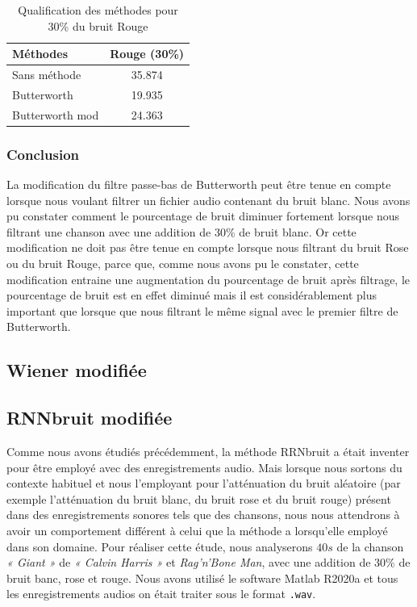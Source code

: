 \documentclass[conference,onecolumn]{IEEEtran}
\begin{document}
\begin{table}[hbt!]
    \centering
    \begin{tabular}{ l  c }
    \textbf{Méthodes} & \textbf{Rouge (30\%)} \\
    \hline
    Sans méthode &  35.874\\
    Butterworth &  19.935\\
    Butterworth mod &  24.363\\
    \end{tabular}
    \caption{Qualification des méthodes pour 30\% du bruit Rouge}
    \label{table:t7}
\end{table}

\subsubsection{Conclusion}
La modification du filtre passe-bas de Butterworth peut être tenue en compte lorsque nous voulant filtrer un fichier audio contenant du bruit blanc. Nous avons pu constater comment le pourcentage de bruit diminuer fortement lorsque nous filtrant une chanson avec une addition de 30\% de bruit blanc. Or cette modification ne doit pas être tenue en compte lorsque nous filtrant du bruit Rose ou du bruit Rouge, parce que, comme nous avons pu le constater, cette modification entraine une augmentation du pourcentage de bruit après filtrage, le pourcentage de bruit est en effet diminué mais il est considérablement plus important que lorsque que nous filtrant le même signal avec le premier filtre de Butterworth.

\subsection{\textbf{Wiener modifiée}}

\subsection{\textbf{RNNbruit modifiée}}
Comme nous avons étudiés précédemment, la méthode RRNbruit a était inventer pour être employé avec des enregistrements audio. Mais lorsque nous sortons du contexte habituel et nous l’employant pour l’atténuation du bruit aléatoire (par exemple l’atténuation du bruit blanc, du bruit rose et du bruit rouge) présent dans des enregistrements sonores tels que des chansons, nous nous attendrons à avoir un comportement différent à celui que la méthode a lorsqu’elle employé dans son domaine. Pour réaliser cette étude, nous analyserons $40s$ de la chanson \textit{« Giant »} de \textit{« Calvin Harris »} et \textit{Rag'n'Bone Man}, avec une addition de 30\% de bruit banc, rose et rouge. Nous avons utilisé le software Matlab R2020a et tous les enregistrements audios on était traiter sous le format \texttt{.wav}.
\end{document}
